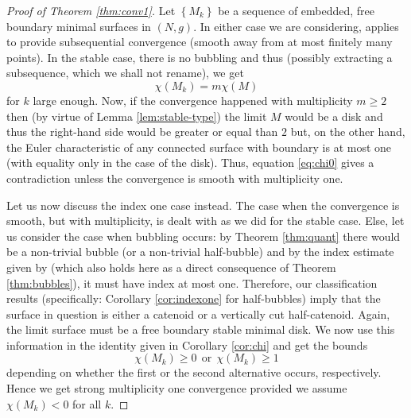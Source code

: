 \documentclass[JEP,XML,SOM,Unicode]{cedram}
\newcounter{cas}
\theoremstyle{definition}
\begin{document}
\begin{proof}[Proof of Theorem \ref{thm:conv1}] Let $\left\{M_k\right\}$ be a sequence of embedded, free boundary minimal surfaces in $(N,g)$. In either case we are considering, \cite[Th.\,2]{ACS17} applies to provide subsequential convergence (smooth away from at most finitely many points).
In the stable case, there is no bubbling and thus (possibly extracting a subsequence, which we shall not rename), we get
\begin{equation}\label{eq:chi0}
\chi(M_k)=m\chi(M)
\end{equation}
for $k$ large enough. Now, if the convergence happened with multiplicity $m\geq 2$ then (by virtue of Lemma \ref{lem:stable-type}) the limit $M$ would be a disk and thus the right-hand side would be greater or equal than $2$ but, on the other hand, the Euler characteristic of any connected surface with boundary is at most one (with equality only in the case of the disk). Thus, equation \eqref{eq:chi0} gives a contradiction unless the convergence is smooth with multiplicity one.

Let us now discuss the index one case instead. The case when the convergence is smooth, but with multiplicity, is dealt with as we did for the stable case. Else, let us consider the case when bubbling occurs: by Theorem \ref{thm:quant} there would be a non-trivial bubble (or a non-trivial half-bubble) and by the index estimate given by \cite[Lem.\,12]{ABCS18} (which also holds here as a direct consequence of Theorem \ref{thm:bubbles}), it must have index at most one. Therefore, our classification results (specifically: Corollary \ref{cor:indexone} for half-bubbles) imply that the surface in question is either a catenoid or a vertically cut half-catenoid. Again, the limit surface must be a free boundary stable minimal disk. We now use this information in the identity given in Corollary \ref{cor:chi} and get the bounds
\[
\chi(M_k)\geq 0 \ \ \text{or} \ \ \chi(M_k)\geq 1
\]
depending on whether the first or the second alternative occurs, respectively. Hence we get strong multiplicity one convergence provided we assume $\chi(M_k)<0$ for all $k$.


\end{proof}
\end{document}
